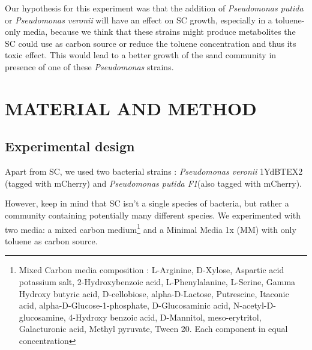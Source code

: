 \documentclass[a4paper, 10pt, conference]{ieeeconf}   %
\begin{document}



Our hypothesis for this experiment was that the addition of \textit{Pseudomonas putida} or \textit{Pseudomonas veronii} will have an effect on SC growth, especially in a toluene-only media, because we think that these strains might produce metabolites the SC could use as carbon source or reduce the toluene concentration and thus its toxic effect. This would lead to a better growth of the sand community in presence of one of these \textit{Pseudomonas} strains.


\section{MATERIAL AND METHOD}

\subsection{Experimental design}
Apart from SC, we used two bacterial strains : \textit{Pseudomonas veronii} 1YdBTEX2 (tagged with mCherry) and \textit{Pseudomonas putida F1}(also tagged with mCherry).

However, keep in mind that SC isn't a single species of bacteria, but rather a community containing potentially many different species.
We experimented with two media: a mixed carbon medium\footnote{Mixed Carbon media composition : L-Arginine, D-Xylose, Aspartic acid potassium salt, 2-Hydroxybenzoic acid, L-Phenylalanine, L-Serine, Gamma Hydroxy butyric acid, D-cellobiose, alpha-D-Lactose, Putrescine, Itaconic acid, alpha-D-Glucose-1-phosphate, D-Glucosaminic acid, N-acetyl-D-glucosamine, 4-Hydroxy benzoic acid, D-Mannitol, meso-erytritol, Galacturonic acid, Methyl pyruvate, Tween 20. Each component in equal concentration} and a Minimal Media 1x (MM) with only toluene as carbon source.
\end{document}
